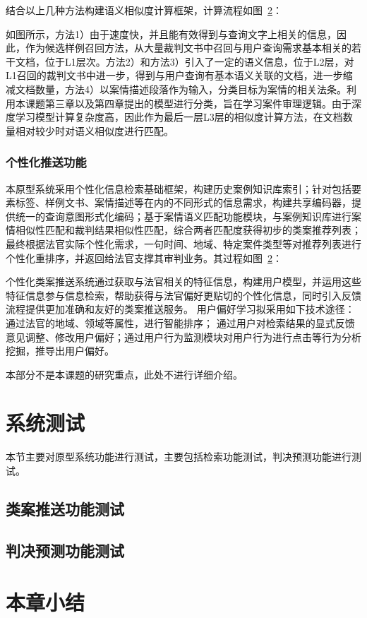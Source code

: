 结合以上几种方法构建语义相似度计算框架，计算流程如图~\ref{}：



如图所示，方法1）由于速度快，并且能有效得到与查询文字上相关的信息，因此，作为候选样例召回方法，从大量裁判文书中召回与用户查询需求基本相关的若干文档，位于L1层次。方法2）和方法3）引入了一定的语义信息，位于L2层，对L1召回的裁判文书中进一步，得到与用户查询有基本语义关联的文档，进一步缩减文档数量，方法4）以案情描述段落作为输入，分类目标为案情的相关法条。利用本课题第三章以及第四章提出的模型进行分类，旨在学习案件审理逻辑。由于深度学习模型计算复杂度高，因此作为最后一层L3层的相似度计算方法，在文档数量相对较少时对语义相似度进行匹配。


\subsubsection{个性化推送功能}
本原型系统采用个性化信息检索基础框架，构建历史案例知识库索引；针对包括要素标签、样例文书、案情描述等在内的不同形式的信息需求，构建共享编码器，提供统一的查询意图形式化编码；基于案情语义匹配功能模块，与案例知识库进行案情相似性匹配和裁判结果相似性匹配，综合两者匹配度获得初步的类案推荐列表；最终根据法官实际个性化需求，一句时间、地域、特定案件类型等对推荐列表进行个性化重排序，并返回给法官支撑其审判业务。其过程如图~\ref{}：

个性化类案推送系统通过获取与法官相关的特征信息，构建用户模型，并运用这些特征信息参与信息检索，帮助获得与法官偏好更贴切的个性化信息，同时引入反馈流程提供更加准确和友好的类案推送服务。 用户偏好学习拟采用如下技术途径： 通过法官的地域、领域等属性，进行智能排序； 通过用户对检索结果的显式反馈意见调整、修改用户偏好；通过用户行为监测模块对用户行为进行点击等行为分析挖掘，推导出用户偏好。

本部分不是本课题的研究重点，此处不进行详细介绍。



\section{系统测试}
本节主要对原型系统功能进行测试，主要包括检索功能测试，判决预测功能进行测试。
\subsection{类案推送功能测试}

\subsection{判决预测功能测试}


\section{本章小结}
